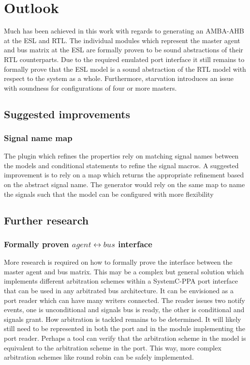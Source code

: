 \section{Outlook}
\label{sec:outl}
Much has been achieved in this work with regards to generating an AMBA-AHB at the ESL and RTL. The individual modules which represent the master agent and bus matrix at the ESL are formally proven to be sound abstractions of their RTL counterparts. Due to the required emulated port interface it still remains to formally prove that the ESL model is a sound abstraction of the RTL model with respect to the system as a whole. Furthermore, starvation introduces an issue with soundness for configurations of four or more masters.    

\subsection{Suggested improvements}
\label{sec:impr}
\subsubsection{Signal name map}
The plugin which refines the properties rely on matching signal names between the models and conditional statements to refine the signal macros. A suggested improvement is to rely on a map which returns the appropriate refinement based on the abstract signal name. The generator would rely on the same map to name the signals such that the model can be configured with more flexibility


\subsection{Further research}
\subsubsection{Formally proven $agent\leftrightarrow bus$ interface}
More research is required on how to formally prove the interface between the master agent and bus matrix. This may be a complex but general solution which implements different arbitration schemes within a SystemC-PPA port interface that can be used in any arbitrated bus architecture. It can be envisioned as a port reader which can have many writers connected. The reader issues two notify events, one is unconditional and signals bus is ready, the other is conditional and signals grant. How arbitration is tackled remains to be determined. It will likely still need to be represented in both the port and in the module implementing the port reader. Perhaps a tool can verify that the arbitration scheme in the model is equivalent to the arbitration scheme in the port. This way, more complex arbitration schemes like round robin can be safely implemented.  


